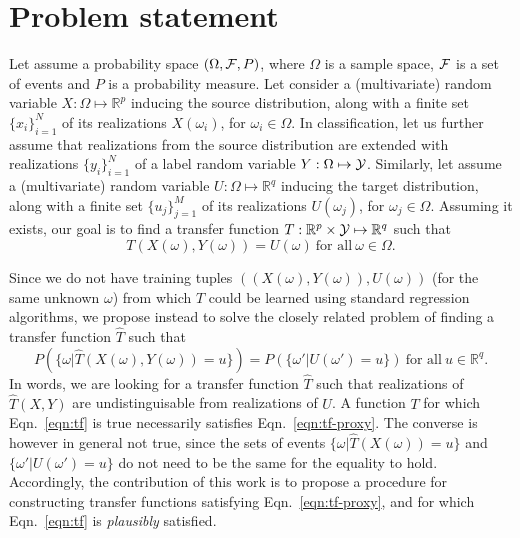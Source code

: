 \documentclass{article}
\begin{document}



\section{Problem statement}

Let assume a probability space $(\Omega, {\cal F}, P)$, where $\Omega$ is a
sample space, ${\cal F}$ is a set of events and $P$ is a probability measure.
Let consider a (multivariate) random variable $X: \Omega \mapsto
\mathbb{R}^p$ inducing the source distribution, along with a
finite set $\{x_i\}_{i=1}^N$ of its realizations $X(\omega_i)$, for $\omega_i
\in \Omega$.
In classification,
let us further assume that realizations from the source distribution are extended with realizations $\{y_i\}_{i=1}^N$
of a label random variable $Y:\Omega \mapsto {\cal Y}$.
Similarly, let assume a (multivariate) random variable $U: \Omega
\mapsto \mathbb{R}^q$ inducing the target distribution, along with a finite set
$\{u_j\}_{j=1}^M$ of its realizations $U(\omega_j)$, for $\omega_j \in \Omega$.
Assuming it exists, our goal is to find a transfer function $T: \mathbb{R}^p \times {\cal Y}
\mapsto \mathbb{R}^q$ such that
\begin{equation}\label{eqn:tf}
T(X(\omega), Y(\omega)) = U(\omega) ~\text{for all}~ \omega \in \Omega.
\end{equation}

Since we do not have training tuples $((X(\omega), Y(\omega)), U(\omega))$ (for the same
unknown $\omega$) from which $T$ could be learned using standard regression
algorithms, we propose instead to solve the closely related problem of
finding a transfer function $\hat T$ such that
\begin{equation}\label{eqn:tf-proxy}
P(\{ \omega | \hat T(X(\omega), Y(\omega)) = u \}) = P(\{ \omega' | U(\omega') = u \}) ~\text{for all}~ u \in \mathbb{R}^q.
\end{equation}
In words, we are looking for a transfer function $\hat T$ such that realizations
of $\hat T(X,Y)$ are undistinguisable from realizations of $U$. A function $T$ for
which Eqn.~\ref{eqn:tf} is true necessarily satisfies Eqn.~\ref{eqn:tf-proxy}.
The converse is however in general not true, since the sets of events $\{ \omega |
\hat T(X(\omega)) = u \}$ and $\{ \omega' | U(\omega') = u \}$ do not need to be
the same for the equality to hold. Accordingly, the contribution of this work is
to propose a procedure for constructing transfer functions satisfying
Eqn.~\ref{eqn:tf-proxy}, and for which Eqn.~\ref{eqn:tf} is {\it plausibly}
satisfied.
\end{document}
